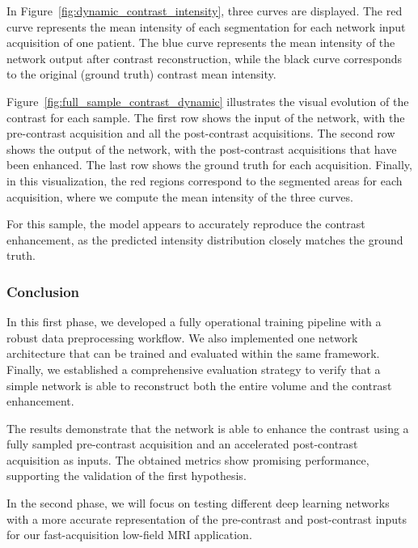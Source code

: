 \documentclass[12pt]{article}
\begin{document}
In Figure~\ref{fig:dynamic_contrast_intensity}, three curves are displayed.
The red curve represents the mean intensity of each segmentation for each network input acquisition of one patient.
The blue curve represents the mean intensity of the network output after contrast reconstruction, while the black curve corresponds to the original (ground truth) contrast mean intensity.
\vspace{0.5cm}

Figure~\ref{fig:full_sample_contrast_dynamic} illustrates the visual evolution of the contrast for each sample.
The first row shows the input of the network, with the pre-contrast acquisition and all the post-contrast acquisitions.
The second row shows the output of the network, with the post-contrast acquisitions that have been enhanced.
The last row shows the ground truth for each acquisition.
Finally, in this visualization, the red regions correspond to the segmented areas for each acquisition, where we compute the mean intensity of the three curves.
\vspace{0.5cm}

For this sample, the model appears to accurately reproduce the contrast enhancement, as the predicted intensity distribution closely matches the ground truth.

\subsubsection{Conclusion} 

In this first phase, we developed a fully operational training pipeline with a robust data preprocessing workflow.
We also implemented one network architecture that can be trained and evaluated within the same framework.
Finally, we established a comprehensive evaluation strategy to verify that a simple network is able to reconstruct both the entire volume and the contrast enhancement.
\vspace{0.5cm}

The results demonstrate that the network is able to enhance the contrast using a fully sampled pre-contrast acquisition and an accelerated post-contrast acquisition as inputs. 
The obtained metrics show promising performance, supporting the validation of the first hypothesis.
\vspace{0.5cm}

In the second phase, we will focus on testing different deep learning networks with a more accurate representation of the pre-contrast and post-contrast inputs for our fast-acquisition low-field MRI application.
\end{document}

